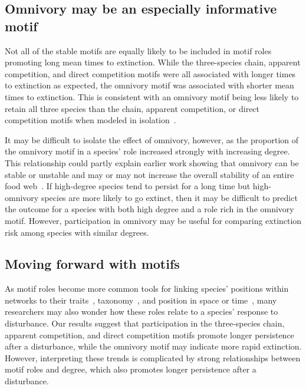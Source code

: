 \documentclass[12pt]{article}
\begin{document}
\begin{spacing}{2.0}
        
    \subsection*{Omnivory may be an especially informative motif}
	    
        Not all of the stable motifs are equally likely to be included in motif roles promoting long mean times to extinction.
        While the three-species chain, apparent competition, and direct competition motifs were all associated with longer times to extinction as expected, the omnivory motif was associated with shorter mean times to extinction. 
        This is consistent with an omnivory motif being less likely to retain all three species than the chain, apparent competition, or direct competition motifs when modeled in isolation~\citep{Borrelli2015a}. 


        It may be difficult to isolate the effect of omnivory, however, as the proportion of the omnivory motif in a species' role increased strongly with increasing degree. 
        This relationship could partly explain earlier work showing that omnivory can be stable or unstable and may or may not increase the overall stability of an entire food web~\citep{McCann1997,Emmerson2004,Borrelli2015a,Monteiro2016}.
        If high-degree species tend to persist for a long time but high-omnivory species are more likely to go extinct, then it may be difficult to predict the outcome for a species with both high degree and a role rich in the omnivory motif.
        However, participation in omnivory may be useful for comparing extinction risk among species with similar degrees.


	\subsection*{Moving forward with motifs}	

        As motif roles become more common tools for linking species' positions within networks to their traits~\citep{Cirtwill2018EcolLett}, taxonomy~\citep{Stouffer2007}, and position in space or time~\citep{Baker2015}, many researchers may also wonder how these roles relate to a species' response to disturbance. 
        Our results suggest that participation in the three-species chain, apparent competition, and direct competition motifs promote longer persistence after a disturbance, while the omnivory motif may indicate more rapid extinction.
        However, interpreting these trends is complicated by strong relationships between motif roles and degree, which also promotes longer persistence after a disturbance.
        

\end{spacing}
\end{document}
